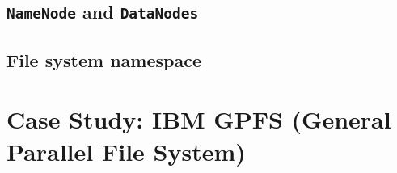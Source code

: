 \documentclass{note}
\begin{document}
\subsection{{\tt{}NameNode} and {\tt{}DataNodes}}
\bit
\w 
\eit

\subsection{File system namespace}


%
%
%
\section{Case Study: IBM GPFS (General Parallel File System)}







\pagebreak
\tableofcontents
\end{document}
